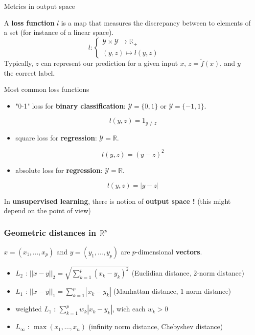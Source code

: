 \documentclass[usenames,dvipsnames]{beamer}
\begin{document}
\begin{frame}{Metrics in output space}

    A \textbf{{loss function}} $l$ is a map that measures the discrepancy between to elements of a set (for instance of a linear space).
$$
l: \left\{
    \begin{array}{ll}
	\mathcal{Y} \times \mathcal{Y} \rightarrow \mathbb{R}_+ & \\
	(y,z) \mapsto l(y,z)& 
    \end{array}
\right.
$$
    Typically, $z$ can represent our prediction for a given input $x$, $z= \tilde{f}(x)$, and $y$ the correct label.

\end{frame}

\begin{frame}{Most common loss functions}
%
	\begin{itemize}

			\item "0-1" loss for \textbf{binary classification}: $ \mathcal{Y}  = \{0, 1\}$ or $ \mathcal{Y}  = \{-1, 1\}$.

	\begin{equation}
	    l(y,z) = 1_{y\neq z}
	\end{equation}


		\item square loss for \textbf{{regression}}: $ \mathcal{Y}  = \mathbb{R} $. 

	\begin{equation}
	    l(y,z) = (y-z)^2
	\end{equation}


		\item absolute loss for \textbf{{regression}}: $ \mathcal{Y}  = \mathbb{R} $. 

	\begin{equation}
	    l(y,z) = |y-z|
	\end{equation}

	\end{itemize}
\end{frame}
\begin{frame}

    In \textbf{unsupervised learning}, there is notion of \textbf{output space !} (this might depend on the point of view)

\end{frame}

\begin{frame}
    \frametitle{Geometric distances in $\mathbb{R}^p $}
    $x=(x_1,...,x_p)$ and $y=(y_1,...,y_p)$ are $p$-dimensional \textbf{vectors}.
    \begin{itemize}
	\item $L_2$ : $||x-y||_2=\sqrt{\sum_{k=1}^{p} (x_k-y_k)^2}$ (Euclidian distance, $2$-norm distance)
	\item $L_1$ : $||x-y||_1=\sum_{k=1}^{p} |x_k-y_k|$ (Manhattan distance, $1$-norm distance)
	\item weighted $L_1$ :  $\sum_{k=1}^{p} w_k|x_k-y_k|$, wich each $w_k >0$
	\item $L_{\infty}$ : $\max ( x_1, \dots, x_n)$ (infinity norm distance, Chebyshev distance)
    \end{itemize}
\end{frame}
\end{document}
